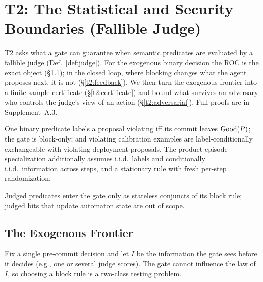 \section{\texorpdfstring{T2: The Statistical and Security\\Boundaries (Fallible Judge)}{T2: The Statistical and Security Boundaries (Fallible Judge)}}\label{sec:t2}

T2 asks what a gate can guarantee when semantic predicates are evaluated by a
fallible judge (Def.~\ref{def:judge}). For the exogenous binary decision the ROC
is the exact object (\S\ref{t2:exogenous}); in the closed loop, where blocking
changes what the agent proposes next, it is not (\S\ref{t2:feedback}). We then
turn the exogenous frontier into a finite-sample certificate
(\S\ref{t2:certificate}) and bound what survives an adversary who controls the
judge's view of an action (\S\ref{t2:adversarial}). Full proofs are in
Supplement~A.3.

\begin{assumption}\label{ass:benign}
One binary predicate labels a proposal violating iff its commit leaves $\mathrm{Good}(P)$; the gate is block-only; and violating calibration examples are label-conditionally
exchangeable with violating deployment proposals. The product-episode specialization
additionally assumes i.i.d.\ labels and conditionally i.i.d.\ information across steps,
and a stationary rule with fresh per-step randomization.
\end{assumption}
\noindent Judged predicates enter the gate only as stateless conjuncts of its block rule; judged bits
that update automaton state are out of scope.

\subsection{The Exogenous Frontier}\label{t2:exogenous}

Fix a single pre-commit decision and let $I$ be the information the gate sees
before it decides (e.g., one or several judge scores). The gate cannot influence
the law of $I$, so choosing a block rule is a two-class testing problem.

